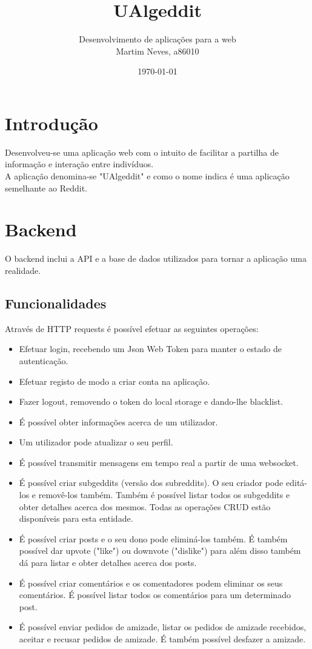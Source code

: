\documentclass{article}
\title{UAlgeddit}
\author{Desenvolvimento de aplicações para a web \\ Martim Neves, a86010}
\date{\today}
\begin{document}
	\maketitle
	
	\tableofcontents
	
	\newpage
	
	\section{Introdução}
	Desenvolveu-se uma aplicação web com o intuito de facilitar a partilha de informação e interação entre indivíduos.\\
	A aplicação denomina-se "UAlgeddit" e como o nome indica é uma aplicação semelhante ao Reddit.
	
	
	\section{Backend}
	O backend inclui a API e a base de dados utilizados para tornar a aplicação uma realidade.
		
	\subsection{Funcionalidades}
	Através de HTTP requests é possível efetuar as seguintes operações:
	\begin{itemize}
		\item Efetuar login, recebendo um Json Web Token para manter o estado de autenticação.
		\item Efetuar registo de modo a criar conta na aplicação.
		\item Fazer logout, removendo o token do local storage e dando-lhe blacklist.
		\item É possível obter informações acerca de um utilizador.
		\item Um utilizador pode atualizar o seu perfil.
		\item É possível transmitir mensagens em tempo real a partir de uma websocket.
		\item É possível criar subgeddits (versão dos subreddits). O seu criador pode editá-los e removê-los também. Também é possível listar todos os subgeddits e obter detalhes acerca dos mesmos. Todas as operações CRUD estão disponíveis para esta entidade.
		\item É possível criar posts e o seu dono pode eliminá-los também. É também possível dar upvote ("like") ou downvote ("dislike") para além disso também dá para listar e obter detalhes acerca dos posts.
		\item É possível criar comentários e os comentadores podem eliminar os seus comentários. É possível listar todos os comentários para um determinado post.
		\item É possível enviar pedidos de amizade, listar os pedidos de amizade recebidos, aceitar e recusar pedidos de amizade. É também possível desfazer a amizade.
	\end{itemize}
\end{document}
